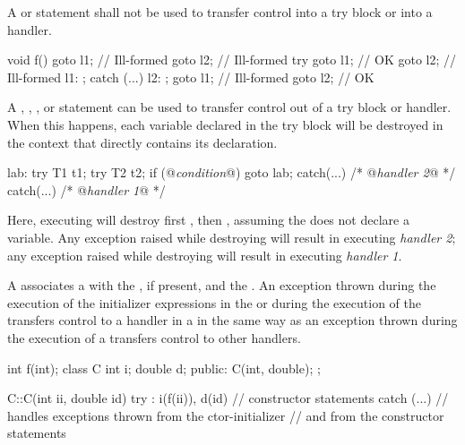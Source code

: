 \pnum
{}%
%
%
%
%
%
A  or  statement shall not be used to transfer control
into a try block or into a handler.
\enterexample
\begin{codeblock}
void f() {
    goto l1;		// Ill-formed
    goto l2;		// Ill-formed
    try {
	goto l1;	// OK
	goto l2;	// Ill-formed
	l1: ;
    } catch (...) {
	l2: ;
	goto l1;	// Ill-formed
	goto l2;	// OK
    }
}

\end{codeblock}
\exitexampleb
{}%
%
%
%
%
%
%
%
A
,
,
,
or
statement can be used to transfer control out of
a try block or handler.
When this happens, each variable declared in the try block
will be destroyed in the context that
directly contains its declaration.
\enterexample

\begin{codeblock}
lab:  try {
	   T1 t1;
	   try {
		  T2 t2;
		  if (@\textit{condition}@)
			goto lab;
	   } catch(...) { /* @\textit{handler 2}@ */ }
      } catch(...) { /* @\textit{handler 1}@ */ }
\end{codeblock}

Here, executing
will destroy first
,
then
,
assuming the
does not declare a variable.
Any exception raised while destroying
will result in executing
\textit{handler 2};
any exception raised while destroying
will result in executing
\textit{handler 1}.
\exitexample

\pnum
{}%
%
A  associates a 
with the ,
if present, and the . An exception
thrown during the execution of the initializer expressions in the
 or during the execution of the
transfers control to a handler in a 
in the same way as an exception thrown during the execution of a
transfers control to other handlers.
\enterexample
\begin{codeblock}
int f(int);
class C {
	int i;
	double d;
public:
	C(int, double);
};

C::C(int ii, double id)
try
	: i(f(ii)), d(id)
{
	// constructor statements
}
catch (...)
{
	// handles exceptions thrown from the ctor-initializer
	// and from the constructor statements
}

\end{codeblock}
\exitexampleb


